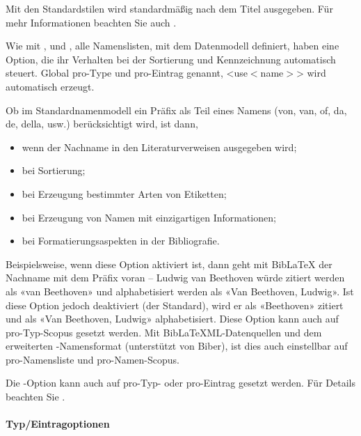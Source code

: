 \documentclass{ltxdockit}[2011/03/25]
\newcommand*{\biber}{Biber\xspace}
\newcommand*{\biblatex}{BibLaTeX\xspace}
\newcommand*{\biblatexml}{BibLaTeXML\xspace}
\begin{document}
\begin{optionlist}
Mit den Standardstilen wird  standardmäßig
nach dem Titel ausgegeben. Für mehr Informationen beachten Sie auch .


Wie mit ,  und , alle Namenslisten, mit dem Datenmodell definiert, haben eine Option, die ihr Verhalten bei der Sortierung und Kennzeichnung automatisch steuert. Global pro-Type und pro-Eintrag genannt,
<use$<$name$>$> wird automatisch erzeugt.


Ob im Standardnamenmodell ein Präfix als Teil eines Namens (von, van, of, da, de, della, usw.) berücksichtigt wird, ist dann, 

\begin{itemize}
\item wenn der  Nachname in den Literaturverweisen ausgegeben wird; 
\item bei Sortierung;
\item bei Erzeugung bestimmter Arten von Etiketten;
\item bei Erzeugung von Namen mit einzigartigen Informationen;
\item bei Formatierungsaspekten in der Bibliografie.
\end{itemize}

Beispielsweise, wenn diese Option aktiviert ist, dann geht mit \biblatex der Nachname mit dem Präfix voran -- Ludwig van Beethoven würde zitiert werden als «van Beethoven» und alphabetisiert werden als «Van Beethoven, Ludwig». Ist diese Option jedoch
deaktiviert (der Standard), wird er als «Beethoven» zitiert und als
«Van Beethoven, Ludwig» alphabetisiert.  Diese Option kann auch auf
pro-Typ-Scopus gesetzt werden.  Mit \biblatexml-Datenquellen und dem erweiterten
\bibtex-Namensformat (unterstützt von \biber), ist dies auch einstellbar auf pro-Namensliste und pro-Namen-Scopus.


Die -Option kann auch auf pro-Typ- oder pro-Eintrag gesetzt werden. 
Für Details beachten Sie .

\end{optionlist}

\paragraph{Typ/Eintragoptionen} \label{use:opt:bib:ded}
\end{document}
